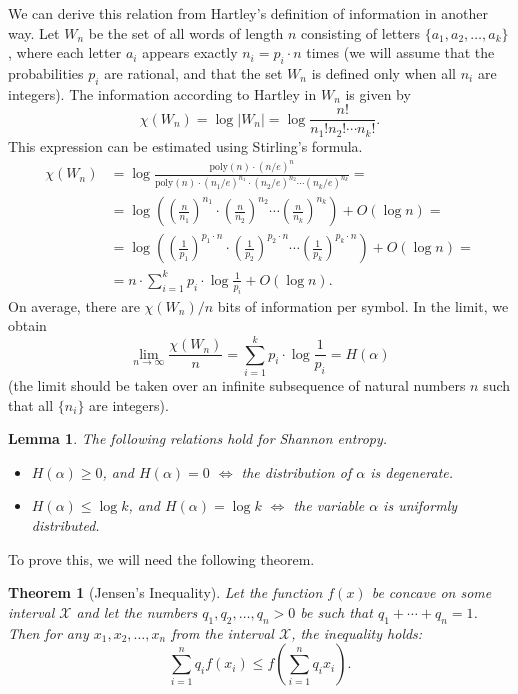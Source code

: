 \documentclass[12pt,sans]{article}
\newcommand{\seqn}[2]{{#1}_1,{#1}_2,\dotsc,{#1}_{#2}}
\newcommand{\poly}{\mathrm{poly}}
\theoremstyle{definition}
\theoremstyle{plain}
\newtheorem{theorem}{Theorem}[section]
\newtheorem{lemma}{Lemma}[section]
\theoremstyle{remark}
\begin{document}
We can derive this relation from Hartley's definition of information in another way. Let \(W_n\) be the set of all words of length \(n\) consisting of letters \(\{\seqn{a}{k}\}\), where each letter \(a_i\) appears exactly \(n_i = p_i \cdot n\) times (we will assume that the probabilities \(p_i\) are rational, and that the set \(W_n\) is defined only when all \(n_i\) are integers). The information according to Hartley in \(W_n\) is given by
\[
\chi(W_n) = \log |W_n| = \log \frac{n!}{n_1! n_2! \dotsb n_k!}.
\]
This expression can be estimated using Stirling's formula.
\[
\begin{aligned}
    \chi(W_n) & = \log \frac{\poly(n) \cdot (n/e)^n}
    {\poly(n) \cdot (n_1/e)^{n_1} \cdot (n_2/e)^{n_2} \dotsm (n_k/e)^{n_k}} = \\
    & = \log \left(\left(\frac{n}{n_1}\right)^{n_1} \cdot
    \left(\frac{n}{n_2}\right)^{n_2} \dotsm
    \left(\frac{n}{n_k}\right)^{n_k}\right) + O(\log n) = \\
    & = \log \left(\left(\frac{1}{p_1}\right)^{p_1 \cdot n} \cdot
    \left(\frac{1}{p_2}\right)^{p_2 \cdot n} \dotsm
    \left(\frac{1}{p_k}\right)^{p_k \cdot n}\right) + O(\log n) = \\
    & = n \cdot \sum_{i=1}^k p_i \cdot \log \frac{1}{p_i} + O(\log n).
\end{aligned}
\]
On average, there are \(\chi(W_n)/n\) bits of information per symbol. In the limit, we obtain
\[
\lim_{n \to \infty} \frac{\chi(W_n)}{n} = \sum_{i=1}^k p_i \cdot \log \frac{1}{p_i} = H(\alpha)
\]
(the limit should be taken over an infinite subsequence of natural numbers \(n\) such that all \(\{n_i\}\) are integers).

\begin{lemma}\label{lm:entropy-properties}
    The following relations hold for Shannon entropy.
    \begin{itemize}
        \item \(H(\alpha) \ge 0\), and \(H(\alpha) = 0\) \(\iff\) the distribution of \(\alpha\) is degenerate.

        \item \(H(\alpha) \le \log k\), and \(H(\alpha) = \log k\) \(\iff\) the variable \(\alpha\) is uniformly distributed.

    \end{itemize}
\end{lemma}

To prove this, we will need the following theorem.

\begin{theorem}[Jensen's Inequality]
    Let the function \(f(x)\) be concave on some interval \(\mathcal{X}\) and let the numbers \(\seqn{q}{n} > 0\) be such that \(q_1 + \dotsb + q_n = 1\). Then for any \(\seqn{x}{n}\) from the interval \(\mathcal{X}\), the inequality holds:
    \[
    \sum_{i=1}^{n} q_{i} f(x_{i}) \leq f\left(\sum_{i=1}^{n} q_{i} x_{i}\right).
    \]
\end{theorem}
\end{document}
